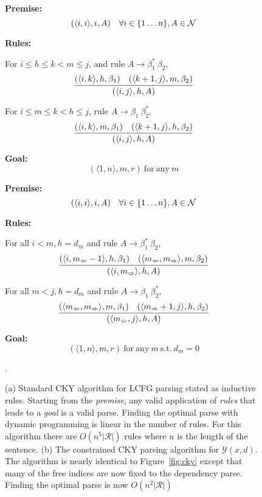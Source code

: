 \documentclass[11pt,letterpaper]{article}
\newcommand{\nonterms}{\mathcal{N}}
\newcommand{\rules}{\mathcal{R}}
\newcommand{\Left}[1]{#1_{\Leftarrow}}
\newcommand{\Right}[1]{#1_{\Rightarrow}}
\newcommand{\Span}[1]{\langle #1 \rangle}
\newcommand{\Root}{r}
\newcommand{\RuleA}[3]{#1 \rightarrow #2^*\ #3}
\newcommand{\RuleB}[3]{#1 \rightarrow #2\ #3^*}
\newcommand{\tri}{\Span{\Left{m}, \Right{m}}}
\begin{document}
\begin{figure*}
  \begin{multicols}{2}
  \noindent \textbf{Premise:}
  \[(\Span{i, i}, i, A)\ \ \ \forall i \in \{1 \ldots n\}, A \in {\cal N}\]

  \noindent\textbf{Rules:}


   For $i\leq h \leq k < m \leq j$,  and  rule  $\RuleA{A}{\beta_1}{\beta_2}$,
   \[\infer{( \Span{i, j},  h,  A)}{( \Span{i, k}, h, \beta_1)  &  ( \Span{k+1, j}, m, \beta_2) } \]

   For $i\leq m \leq k < h \leq j$, rule  $\RuleB{A}{\beta_1}{\beta_2}$,
   \[\infer{(\Span{i, j},  h, A)}{(\Span{i, k}, m, \beta_1)  &  (\Span{k+1, j}, h, \beta_2) }  \]

\noindent \textbf{Goal:}\[ (\Span{1, n}, m, \Root) \mathrm{\ for\ any }\ m\]
\label{fig:cky}


  \noindent \textbf{Premise:}
  \[(\langle i,i \rangle, i, A)\ \ \ \forall i \in \{1 \ldots n\}, A \in {\cal N}\]

  \noindent\textbf{Rules:}



   For all   $i < m, h = d_m$  and rule  $\RuleA{A}{\beta_1}{\beta_2}$,
  \[\infer{( \Span{ i, \Right{m} }, h, A)}{(\Span{i, \Left{m}-1}, h, \beta_1)  &  (\tri, m, \beta_2) } \]

  For all    $m < j, h = d_m$ and  rule  $\RuleB{A}{\beta_1}{\beta_2}$,
  \[ \infer{( \Span{\Left{m}, j}, h, A)}{(\tri, m, \beta_1)  &  (\Span{\Right{m}+ 1, j}, h, \beta_2) } \]



\noindent \textbf{Goal:}\[ (\Span{1, n}, m, \Root) \mathrm{\ for\ any }\ m \mathrm{\ s.t. \ } d_m = 0  \]
\end{multicols}
\label{fig:cky_new}
\caption{(a) Standard CKY algorithm for LCFG parsing stated as inductive rules. Starting from the \textit{premise}, any valid application of \textit{rules} that leads to a \textit{goal} is a valid parse. Finding the optimal parse with dynamic programming is linear in the number of rules. For this algorithm there are $O(n^5|\rules|)$ rules where $n$ is the length of the sentence. (b) The constrained CKY parsing algorithm for $\mathcal{Y}(x, d)$. The algorithm is nearly identical to Figure~\ref{fig:cky} except that many of the free indices are now fixed to the dependency parse. Finding the optimal parse is now $O(n^2|\rules|)$}.
\end{figure*}
\end{document}

